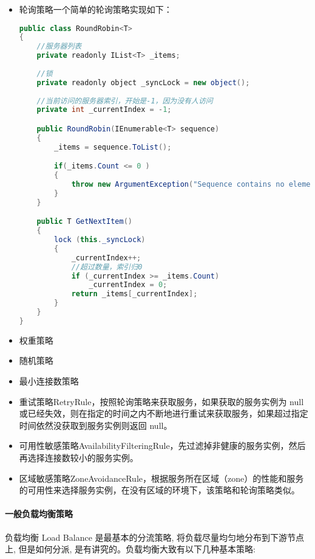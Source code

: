 \documentclass[../../../interview-questions.tex]{subfiles}
\begin{document}
\begin{itemize}
    \item {轮询策略}一个简单的轮询策略实现如下：
    
\begin{lstlisting}[language=Java]
public class RoundRobin<T>
{
    //服务器列表
    private readonly IList<T> _items;
    
    //锁
    private readonly object _syncLock = new object();
    
    //当前访问的服务器索引，开始是-1，因为没有人访问
    private int _currentIndex = -1;

    public RoundRobin(IEnumerable<T> sequence)
    {
        _items = sequence.ToList();

        if(_items.Count <= 0 )
        {
            throw new ArgumentException("Sequence contains no elements.", nameof(sequence));
        }                           
    }

    public T GetNextItem()
    {
        lock (this._syncLock)
        {
            _currentIndex++;
            //超过数量，索引归0
            if (_currentIndex >= _items.Count)
                _currentIndex = 0;
            return _items[_currentIndex];
        }
    }
}    
\end{lstlisting}


    \item {权重策略}
    \item {随机策略}
    \item {最小连接数策略}
    \item {重试策略}RetryRule，按照轮询策略来获取服务，如果获取的服务实例为 null 或已经失效，则在指定的时间之内不断地进行重试来获取服务，如果超过指定时间依然没获取到服务实例则返回 null。
    \item {可用性敏感策略}AvailabilityFilteringRule，先过滤掉非健康的服务实例，然后再选择连接数较小的服务实例。
    \item {区域敏感策略}ZoneAvoidanceRule，根据服务所在区域（zone）的性能和服务的可用性来选择服务实例，在没有区域的环境下，该策略和轮询策略类似。
\end{itemize}

\paragraph{一般负载均衡策略}

负载均衡 Load Balance 是最基本的分流策略, 将负载尽量均匀地分布到下游节点上, 但是如何分派, 是有讲究的。负载均衡大致有以下几种基本策略:
\end{document}
